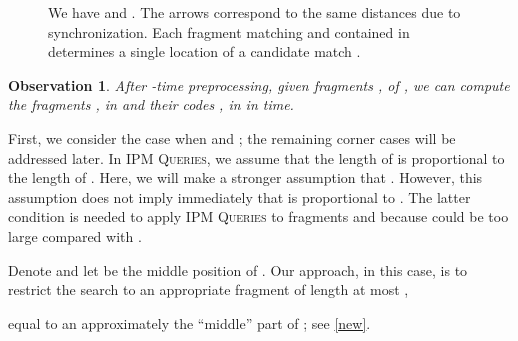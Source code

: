 \documentclass[a4paper]{article}
\newtheorem{observation}[theorem]{Observation}
\theoremstyle{definition}
\theoremstyle{remark}
\newcommand{\IPM}{\textsc{IPM Queries}\xspace}
\begin{document}
\begin{figure}[h]
  
  
  \caption{We have  and .
The arrows correspond to the same distances due to synchronization. Each fragment  matching  and contained in  determines a single location of a candidate match .}\label{fig:zz1}
\end{figure}

\begin{observation}
After -time preprocessing, given fragments ,  of ,
we can compute the fragments ,  in  and 
their codes ,  in  in  time.
\end{observation}

First, we consider the case when  and ; the remaining corner cases will be addressed later.
In \IPM, we assume that the length of  is proportional to the length of . 
Here, we will make a stronger assumption that . 
However, this assumption does not imply immediately that  is proportional to .
The latter condition is needed to apply \IPM to fragments  and  because  could be too large compared with .

Denote  and let  be the middle position of .
Our approach, in this case, is to restrict the search to 
an appropriate fragment of length at most ,

equal to an approximately the ``middle'' part of ; see \cref{new}.
\end{document}
